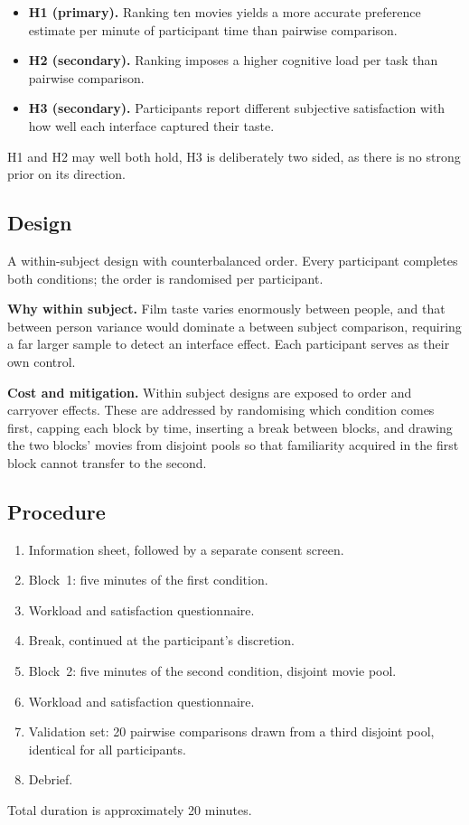 \documentclass[11pt]{article}
\begin{document}
\begin{itemize}
\item \textbf{H1 (primary).} Ranking ten movies yields a more accurate preference estimate per minute of participant time than pairwise comparison.
\item \textbf{H2 (secondary).} Ranking imposes a higher cognitive load per task than pairwise comparison.
\item \textbf{H3 (secondary).} Participants report different subjective satisfaction with how well each interface captured their taste.
\end{itemize}

H1 and H2 may well both hold, H3 is deliberately two sided, as there is no strong prior on its direction.

\subsection{Design}
A within-subject design with counterbalanced order. Every participant completes both conditions; the order is randomised per participant.

\textbf{Why within subject.} Film taste varies enormously between people, and that between person variance would dominate a between subject comparison, requiring a far larger sample to detect an interface effect. Each participant serves as their own control.

\textbf{Cost and mitigation.} Within subject designs are exposed to order and carryover effects. These are addressed by randomising which condition comes first, capping each block by time, inserting a break between blocks, and drawing the two blocks' movies from disjoint pools so that familiarity acquired in the first block cannot transfer to the second.

\subsection{Procedure}
\begin{enumerate}
\item Information sheet, followed by a separate consent screen.
\item Block~1: five minutes of the first condition.
\item Workload and satisfaction questionnaire.
\item Break, continued at the participant's discretion.
\item Block~2: five minutes of the second condition, disjoint movie pool.
\item Workload and satisfaction questionnaire.
\item Validation set: 20 pairwise comparisons drawn from a third disjoint pool, identical for all participants.
\item Debrief.
\end{enumerate}
Total duration is approximately 20 minutes.
\end{document}
